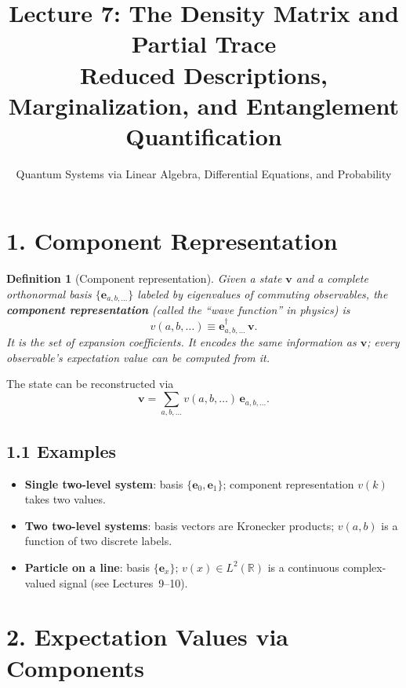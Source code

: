 \documentclass[12pt,a4paper]{article}
\title{\textbf{Lecture 7: The Density Matrix and Partial Trace} \\ \large Reduced Descriptions, Marginalization, and Entanglement Quantification}
\author{Quantum Systems via Linear Algebra, Differential Equations, and Probability}
\date{}
\newtheorem{definition}{Definition}
\begin{document}
\maketitle
\thispagestyle{fancy}

\section{1. Component Representation}

\begin{definition}[Component representation]
Given a state $\mathbf{v}$ and a complete orthonormal basis $\{\mathbf{e}_{a,b,\dots}\}$ labeled by eigenvalues of commuting observables, the \textbf{component representation} (called the ``wave function'' in physics) is
\[
    v(a,b,\dots) \equiv \mathbf{e}_{a,b,\dots}^\dagger\,\mathbf{v}.
\]
It is the set of expansion coefficients.  It encodes the same information as $\mathbf{v}$; every observable's expectation value can be computed from it.
\end{definition}

\noindent The state can be reconstructed via
\[
    \mathbf{v} = \sum_{a,b,\dots} v(a,b,\dots)\,\mathbf{e}_{a,b,\dots}.
\]

\subsection{1.1 Examples}
\begin{itemize}[nosep]
    \item \textbf{Single two-level system}: basis $\{\mathbf{e}_0,\mathbf{e}_1\}$; component representation $v(k)$ takes two values.
    \item \textbf{Two two-level systems}: basis vectors are Kronecker products; $v(a,b)$ is a function of two discrete labels.
    \item \textbf{Particle on a line}: basis $\{\mathbf{e}_x\}$; $v(x) \in L^2(\mathbb{R})$ is a continuous complex-valued signal (see Lectures~9--10).
\end{itemize}

\section{2. Expectation Values via Components}
\end{document}
